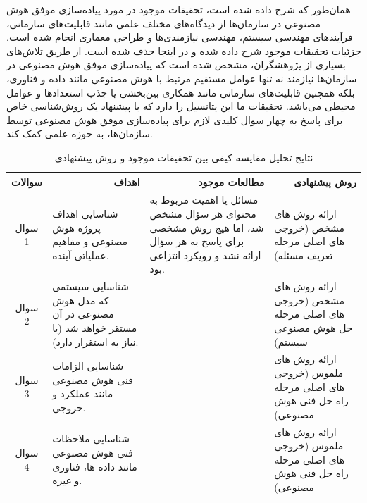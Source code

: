 \documentclass[a4paper,10pt]{article}
\begin{document}
            همان‌طور که شرح داده شده است، تحقیقات موجود در مورد پیاده‌سازی موفق هوش مصنوعی در سازمان‌ها از دیدگاه‌های مختلف علمی مانند قابلیت‌های سازمانی، فرآیندهای مهندسی سیستم، مهندسی نیازمندی‌ها و طراحی معماری انجام شده است. جزئیات تحقیقات موجود شرح داده شده و در اینجا حذف شده است. از طریق تلاش‌های بسیاری از پژوهشگران، مشخص شده است که پیاده‌سازی موفق هوش مصنوعی در سازمان‌ها نیازمند نه تنها عوامل مستقیم مرتبط با هوش مصنوعی مانند داده و فناوری، بلکه همچنین قابلیت‌های سازمانی مانند همکاری بین‌بخشی یا جذب استعدادها و عوامل محیطی می‌باشد. تحقیقات ما این پتانسیل را دارد که با پیشنهاد یک روش‌شناسی خاص برای پاسخ به چهار سوال کلیدی لازم برای پیاده‌سازی موفق هوش مصنوعی توسط سازمان‌ها، به حوزه علمی کمک کند.

            \begin{table}[htbp]
                        
                \centering
                \caption{نتایج تحلیل مقایسه کیفی بین تحقیقات موجود و روش پیشنهادی}
                \begin{tabularx}{\textwidth}{ c X X X }
                    
                    \hline

                    \multicolumn{1}{c}{سوالات} & \multicolumn{1}{r}{اهداف} & \multicolumn{1}{r}{مطالعات موجود} & \multicolumn{1}{r}{روش پیشنهادی} \\

                    \hline

                    \multicolumn{1}{c}{سوال 1} & شناسایی اهداف پروژه هوش مصنوعی و مفاهیم عملیاتی آینده. & مسائل یا اهمیت مربوط به محتوای هر سؤال مشخص شد، اما هیچ روش مشخصی برای پاسخ به هر سؤال ارائه نشد و رویکرد انتزاعی بود. & ارائه روش های مشخص (خروجی های اصلی مرحله تعریف مسئله) \\
                    \multicolumn{1}{c}{سوال 2} & شناسایی سیستمی که مدل هوش مصنوعی در آن مستقر خواهد شد (یا نیاز به استقرار دارد). &  & ارائه روش های مشخص (خروجی های اصلی مرحله حل هوش مصنوعی سیستم) \\
                    \multicolumn{1}{c}{سوال 3} & شناسایی الزامات فنی هوش مصنوعی مانند عملکرد و خروجی. &  & ارائه روش های ملموس (خروجی های اصلی مرحله راه حل فنی هوش مصنوعی) \\
                    \multicolumn{1}{c}{سوال 4} & شناسایی ملاحظات فنی هوش مصنوعی مانند داده ها، فناوری و غیره. &  & ارائه روش های ملموس (خروجی های اصلی مرحله راه حل فنی هوش مصنوعی) \\
                    
                    \hline

                \end{tabularx}
                
            \end{table}
\end{document}
